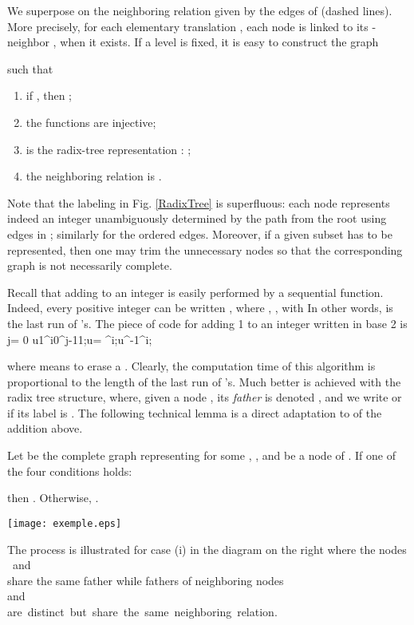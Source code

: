 We superpose  on   the neighboring relation given by the edges of  (dashed lines). More precisely, for each elementary translation , each  node  is linked  to its  -neighbor  , when it exists. 
If a level  is fixed, it is easy to construct the graph 

 such that 
\begin{enumerate}[\rm (i)]
\item if , then  ; 
\item the functions   are injective;
\item  is the radix-tree representation :  ;\smallskip
\item the neighboring relation is .
\end{enumerate}


Note that the labeling in Fig. \ref{RadixTree} is superfluous:  each node represents indeed an integer unambiguously determined by the path from the root using edges in ; similarly for the ordered edges.
Moreover, if a given subset  has to be represented, then one may trim the unnecessary nodes so that  the corresponding graph   is not necessarily complete. \smallskip
 
Recall that adding  to an integer   is easily performed by a sequential function. 
Indeed, every positive integer can be written , where ,  , with 
 In other words,  is the last run of 's.
The piece of code for adding 1 to an integer written in base 2 is\medskip
j\not = 0 u1^i0^{j-1}1;u= ^i;u^{-1}^i;\medskip


\noindent where  means to erase a . Clearly, the computation time of this algorithm  is proportional to the length of the last run of 's.  Much better is achieved with  the radix tree structure, where, given a node , its {\em father} is denoted  , and we write  or  if its label is .
The following technical lemma is a direct  adaptation to   of the addition above.
\begin{lemma}\label{condition} Let  be the complete graph representing  for some ,  , and  be a node of . If one of the four conditions holds:

then . Otherwise, .
\end{lemma}
\medskip
\begin{floatingfigure}[h!r]{3in}
\centering
\texttt{[image: exemple.eps]}
\end{floatingfigure}
\noindent  The process is illustrated for case (i) in the diagram on the right
where the nodes\vspace{4pt} 
\hbox{ and  }\medskip
\\
share the same father while fathers of neighboring nodes\medskip\\
\smallskip
  and \\
\smallskip \hbox{are distinct but share the same neighboring relation.}


